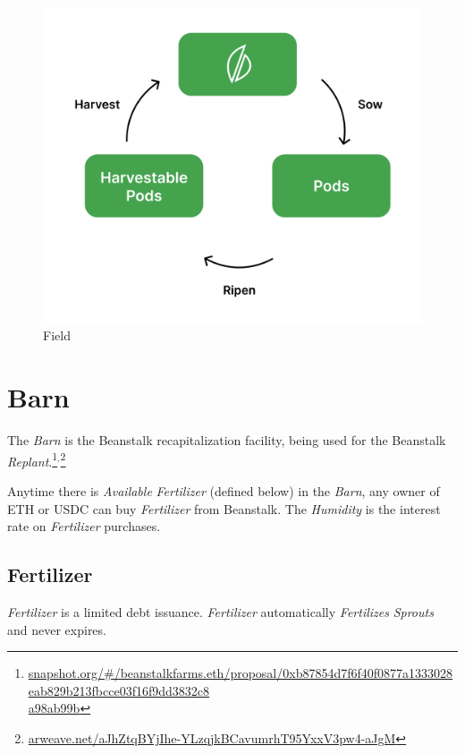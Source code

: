 \documentclass[tikz]{article}
\newcommand{\term}[1]{\textsl{#1}}
\begin{document}
\begin{figure}[h!]
    \centering
    \includegraphics[scale=.14]{Figure2}
    \vspace*{-5mm}
    \caption{Field}
    \label{fig 2}
\end{figure}

\newpage
\section{Barn}
The \term{Barn} is the Beanstalk recapitalization facility, being used for the Beanstalk \term{Replant}.\footnote{\href{https://snapshot.org/\#/beanstalkfarms.eth/proposal/0xb87854d7f6f40f0877a1333028eab829b213fbcce03f16f9dd3832c8a98ab99b}{snapshot.org/\#/beanstalkfarms.eth/proposal/0xb87854d7f6f40f0877a1333028eab829b213fbcce03f16f9dd3832c8\\a98ab99b}}$^{,}$\footnote{\href{https://ncmftnvalcgiqxtaxtvi4qccnl52nlqu7xsyy4kxpjyodita.arweave.net/aJhZtqBYjIhe-YLzqjkBCavumrhT95YxxV3pw4-aJgM}{arweave.net/aJhZtqBYjIhe-YLzqjkBCavumrhT95YxxV3pw4-aJgM}}

Anytime there is \term{Available} \term{Fertilizer} (defined below) in the \term{Barn}, any owner of ETH or USDC can buy \term{Fertilizer} from Beanstalk. The \term{Humidity} is the interest rate on \term{Fertilizer} purchases.

\subsection{Fertilizer}
\term{Fertilizer} is a limited debt issuance. \term{Fertilizer} automatically \term{Fertilizes} \term{Sprouts} and never expires.
\end{document}
